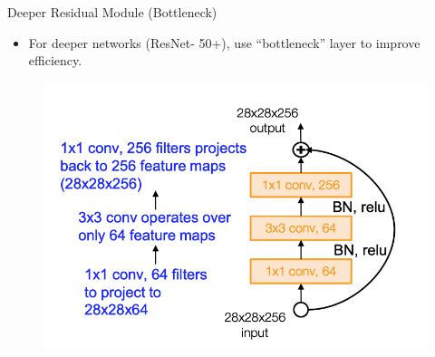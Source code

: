 \documentclass[serif, aspectratio=169]{beamer}
\begin{document}
\begin{frame}{Deeper Residual Module (Bottleneck)}
	\begin{itemize}
		\item For deeper networks (ResNet- 50+), use “bottleneck” layer to improve efficiency.
	\end{itemize}
	
	\begin{figure}[htpb]
		\begin{center}
			\includegraphics[keepaspectratio, scale=0.3]{pic/res_arch3}
		\end{center}
	\end{figure}
\end{frame}
\end{document}
